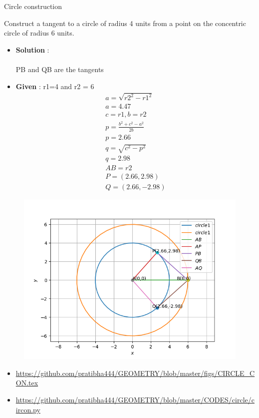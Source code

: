 \begin{frame}{Circle construction}

 Construct a tangent to a circle of radius 4 units
from a point on the concentric circle of radius
6 units.\\
\begin{itemize}
\item\textbf{Solution} :\\
\\  PB and QB are the tangents 
\end{itemize}
\seti
\end{frame}

\begin{frame}
\begin{itemize}
\item \textbf{Given} : r1=4 and r2 = 6\\
\begin{align*}
a=\sqrt{r2^2 - r1^2}\\
a=4.47\\
c=r1 , b=r2\\
p=\frac{b^2+c^2-a^2}{2b}\\
p=2.66\\
q=\sqrt{c^2 - p^2}\\
q=2.98\\
AB = r2 \\
P = (2.66,2.98)\\
Q = (2.66,-2.98)
\end{align*}
\end{itemize}

\end{frame}


\begin{frame}
\begin{figure}
\includegraphics[scale=.4]{./CODES/circle/CIR_CON.png}
\end{figure}
\begin{itemize}
\item \url{https://github.com/pratibha444/GEOMETRY/blob/master/figs/CIRCLE_CON.tex}  \\
\item \url{https://github.com/pratibha444/GEOMETRY/blob/master/CODES/circle/circon.py}
\end{itemize}
\end{frame}